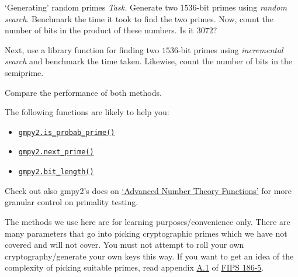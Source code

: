 \documentclass{practice}
\begin{document}
\begin{task}{`Generating' random primes}
  \textit{Task.}
  Generate two $1536$-bit primes using \emph{random search}.
  Benchmark the time it took to find the two primes.
  Now, count the number of bits in the product of these numbers.
  Is it $3072$?

  Next, use a library function for finding two $1536$-bit primes using \emph{incremental search} and benchmark the time taken.
  Likewise, count the number of bits in the semiprime.

  Compare the performance of both methods.

  The following functions are likely to help you:
  \begin{itemize}
    \item \href{https://gmpy2.readthedocs.io/en/latest/mpz.html#gmpy2.mpz.is_probab_prime}{\texttt{gmpy2.is\_probab\_prime()}}
    \item \href{https://gmpy2.readthedocs.io/en/latest/mpz.html#gmpy2.next_prime}{\texttt{gmpy2.next\_prime()}}
    \item \href{https://gmpy2.readthedocs.io/en/latest/mpz.html#gmpy2.bit_length}{\texttt{gmpy2.bit\_length()}}
  \end{itemize}

  Check out also gmpy2's docs on \href{https://gmpy2.readthedocs.io/en/latest/advmpz.html#advanced-number-theory-functions}{`Advanced Number Theory Functions'} for more granular control on primality testing.

  \begin{tcolorbox}[title=Warning]
    The methods we use here are for learning purposes/convenience only.
    There are many parameters that go into picking cryptographic primes which we have not covered and will not cover.
    You must not attempt to roll your own cryptography/generate your own keys this way.
    \tcblower
    If you want to get an idea of the complexity of picking suitable primes, read appendix \href{https://nvlpubs.nist.gov/nistpubs/FIPS/NIST.FIPS.186-5.pdf#page=42}{A.1} of \href{https://csrc.nist.gov/pubs/fips/186-5/final}{FIPS 186-5}.
  \end{tcolorbox}
\end{task}
\end{document}
